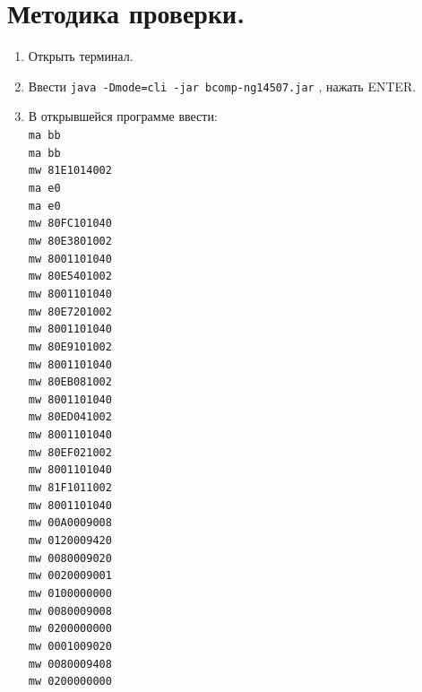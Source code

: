 \section{Методика проверки.}

\begin{enumerate}
    \item Открыть терминал.
    \item Ввести \texttt{java -Dmode=cli -jar bcomp-ng14507.jar} , нажать ENTER.
    \item В открывшейся программе ввести:   \\
    \texttt{ma bb   \\
    ma bb   \\
    mw 81E1014002   \\
    ma e0           \\
    ma e0           \\
    mw 80FC101040   \\
    mw 80E3801002   \\
    mw 8001101040   \\
    mw 80E5401002   \\
    mw 8001101040   \\
    mw 80E7201002   \\
    mw 8001101040   \\
    mw 80E9101002   \\
    mw 8001101040   \\
    mw 80EB081002   \\
    mw 8001101040   \\
    mw 80ED041002   \\
    mw 8001101040   \\
    mw 80EF021002   \\
    mw 8001101040   \\
    mw 81F1011002   \\
    mw 8001101040   \\
    mw 00A0009008   \\
    mw 0120009420   \\
    mw 0080009020   \\
    mw 0020009001   \\
    mw 0100000000   \\
    mw 0080009008   \\
    mw 0200000000   \\
    mw 0001009020   \\
    mw 0080009408   \\
    mw 0200000000   \\
}
\end{enumerate}
